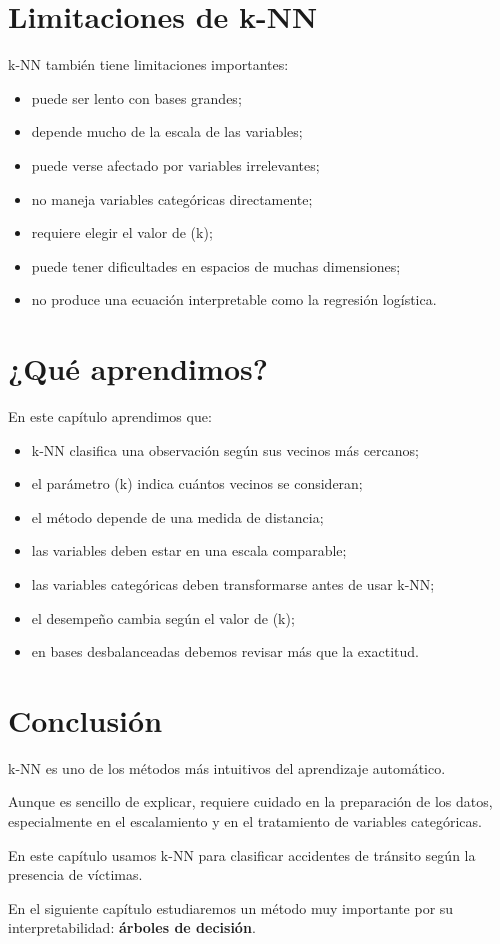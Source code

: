\documentclass[
  11pt,
  letterpaper,
]{book}
\providecommand{\tightlist}{%
  \setlength{\itemsep}{0pt}\setlength{\parskip}{0pt}}
\begin{document}
\section{Limitaciones de k-NN}\label{limitaciones-de-k-nn}

k-NN también tiene limitaciones importantes:

\begin{itemize}
\tightlist
\item
  puede ser lento con bases grandes;
\item
  depende mucho de la escala de las variables;
\item
  puede verse afectado por variables irrelevantes;
\item
  no maneja variables categóricas directamente;
\item
  requiere elegir el valor de (k);
\item
  puede tener dificultades en espacios de muchas dimensiones;
\item
  no produce una ecuación interpretable como la regresión logística.
\end{itemize}

\section{¿Qué aprendimos?}\label{quuxe9-aprendimos-1}

En este capítulo aprendimos que:

\begin{itemize}
\tightlist
\item
  k-NN clasifica una observación según sus vecinos más cercanos;
\item
  el parámetro (k) indica cuántos vecinos se consideran;
\item
  el método depende de una medida de distancia;
\item
  las variables deben estar en una escala comparable;
\item
  las variables categóricas deben transformarse antes de usar k-NN;
\item
  el desempeño cambia según el valor de (k);
\item
  en bases desbalanceadas debemos revisar más que la exactitud.
\end{itemize}

\section{Conclusión}\label{conclusiuxf3n-3}

k-NN es uno de los métodos más intuitivos del aprendizaje automático.

Aunque es sencillo de explicar, requiere cuidado en la preparación de
los datos, especialmente en el escalamiento y en el tratamiento de
variables categóricas.

En este capítulo usamos k-NN para clasificar accidentes de tránsito
según la presencia de víctimas.

En el siguiente capítulo estudiaremos un método muy importante por su
interpretabilidad: \textbf{árboles de decisión}.


\backmatter
\end{document}
